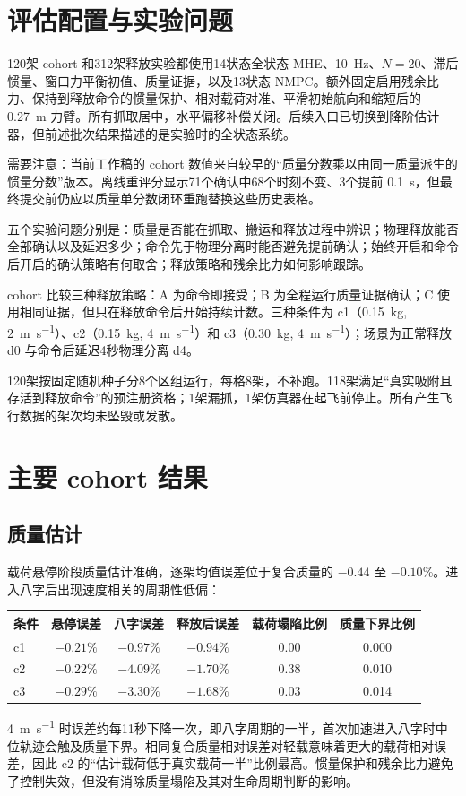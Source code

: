 \documentclass[11pt,UTF8,fontset=none]{ctexrep}
\begin{document}
\section{评估配置与实验问题}

120架 cohort 和312架释放实验都使用14状态全状态 MHE、\SI{10}{\hertz}、$N=20$、滞后惯量、窗口力平衡初值、质量证据，以及13状态 NMPC。额外固定启用残余比力、保持到释放命令的惯量保护、相对载荷对准、平滑初始航向和缩短后的 \SI{0.27}{\meter} 力臂。所有抓取居中，水平偏移补偿关闭。后续入口已切换到降阶估计器，但前述批次结果描述的是实验时的全状态系统。

需要注意：当前工作稿的 cohort 数值来自较早的“质量分数乘以由同一质量派生的惯量分数”版本。离线重评分显示71个确认中68个时刻不变、3个提前 \SI{0.1}{\second}，但最终提交前仍应以质量单分数闭环重跑替换这些历史表格。

五个实验问题分别是：质量是否能在抓取、搬运和释放过程中辨识；物理释放能否全部确认以及延迟多少；命令先于物理分离时能否避免提前确认；始终开启和命令后开启的确认策略有何取舍；释放策略和残余比力如何影响跟踪。

cohort 比较三种释放策略：A 为命令即接受；B 为全程运行质量证据确认；C 使用相同证据，但只在释放命令后开始持续计数。三种条件为 c1（\SI{0.15}{\kg}, \SI{2}{\meter\per\second}）、c2（\SI{0.15}{\kg}, \SI{4}{\meter\per\second}）和 c3（\SI{0.30}{\kg}, \SI{4}{\meter\per\second}）；场景为正常释放 d0 与命令后延迟4秒物理分离 d4。

120架按固定随机种子分8个区组运行，每格8架，不补跑。118架满足“真实吸附且存活到释放命令”的预注册资格；1架漏抓，1架仿真器在起飞前停止。所有产生飞行数据的架次均未坠毁或发散。

\section{主要 cohort 结果}

\subsection{质量估计}

载荷悬停阶段质量估计准确，逐架均值误差位于复合质量的 $-0.44$ 至 $-0.10$\%。进入八字后出现速度相关的周期性低偏：
\begin{center}\small
\begin{tabular}{lccccc}
\toprule
条件 & 悬停误差 & 八字误差 & 释放后误差 & 载荷塌陷比例 & 质量下界比例\\
\midrule
c1 & $-0.21\%$ & $-0.97\%$ & $-0.94\%$ & 0.00 & 0.000\\
c2 & $-0.22\%$ & $-4.09\%$ & $-1.70\%$ & 0.38 & 0.010\\
c3 & $-0.29\%$ & $-3.30\%$ & $-1.68\%$ & 0.03 & 0.014\\
\bottomrule
\end{tabular}
\end{center}
\SI{4}{\meter\per\second} 时误差约每11秒下降一次，即八字周期的一半，首次加速进入八字时中位轨迹会触及质量下界。相同复合质量相对误差对轻载意味着更大的载荷相对误差，因此 c2 的“估计载荷低于真实载荷一半”比例最高。惯量保护和残余比力避免了控制失效，但没有消除质量塌陷及其对生命周期判断的影响。
\end{document}
